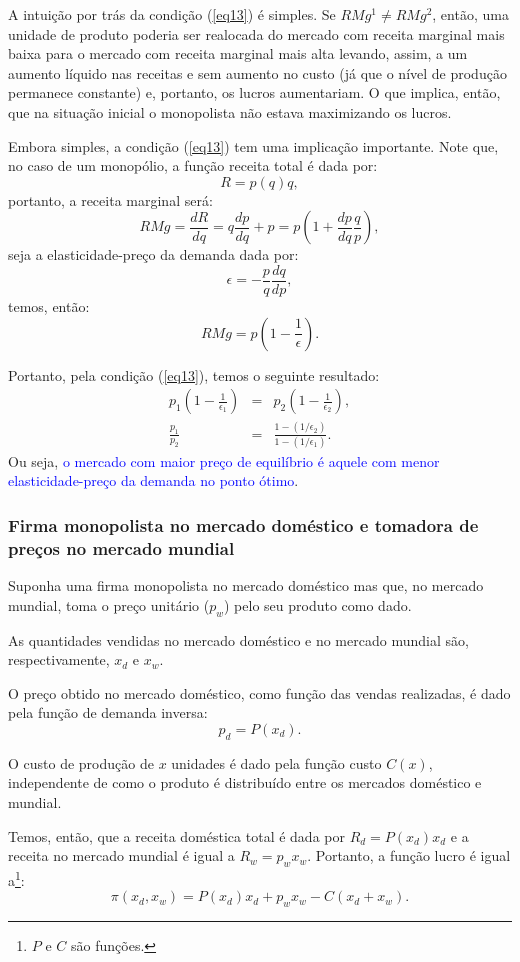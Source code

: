 \documentclass[preprintnumbers,nofootinbib,amsmath,amssymb,12pt]{article}
\begin{document}
A intuição por trás da condição (\ref{eq13}) é simples. Se $RMg^1 \neq RMg^2$, então, uma unidade de produto poderia ser realocada do mercado com receita marginal mais baixa para o mercado com receita marginal mais alta levando, assim, a um aumento líquido nas receitas e sem aumento no custo (já que o nível de produção permanece constante) e, portanto, os lucros aumentariam. O que implica, então, que na situação inicial o monopolista não estava maximizando os lucros.

Embora simples, a condição (\ref{eq13}) tem uma implicação importante. Note que, no caso de um monopólio, a função receita total é dada por:
\[
R = p(q)q,
\]
portanto, a receita marginal será:
\[
RMg = \frac{dR}{dq} = q\frac{dp}{dq} + p = p\left(1 + \frac{dp}{dq}\frac{q}{p}\right),
\]
seja a elasticidade-preço da demanda dada por:
\[
\epsilon = -\frac{p}{q}\frac{dq}{dp},
\]
temos, então:
\[
RMg = p\left(1 - \frac{1}{\epsilon}\right).
\]

Portanto, pela condição (\ref{eq13}), temos o seguinte resultado:
\begin{eqnarray}
p_1\left(1-\frac{1}{\epsilon_1}\right) &=& p_2\left(1-\frac{1}{\epsilon_2}\right), \nonumber \\
\frac{p_1}{p_2} &=& \frac{1-(1/\epsilon_2)}{1-(1/\epsilon_1)}. \label{eq14}
\end{eqnarray}
Ou seja, \textcolor{blue}{o mercado com maior preço de equilíbrio é aquele com menor elasticidade-preço da demanda no ponto ótimo}.

\subsubsection{Firma monopolista no mercado doméstico e tomadora de preços no mercado mundial}

Suponha uma firma monopolista no mercado doméstico mas que, no mercado mundial, toma o preço unitário ($p_w$) pelo seu produto como dado.

As quantidades vendidas no mercado doméstico e no mercado mundial são, respectivamente, $x_d$ e $x_w$.

O preço obtido no mercado doméstico, como função das vendas realizadas, é dado pela função de demanda inversa:
\[
p_d = P(x_d).
\]

O custo de produção de $x$ unidades é dado pela função custo $C(x)$, independente de como o produto é distribuído entre os mercados doméstico e mundial.

Temos, então, que a receita doméstica total é dada por $R_d = P(x_d)x_d$ e a receita no mercado mundial é igual a $R_w = p_wx_w$. Portanto, a função lucro é igual a\footnote{$P$ e $C$ são funções.}:
\[
\pi(x_d, x_w) = P(x_d)x_d + p_wx_w - C(x_d + x_w).
\]
\end{document}
